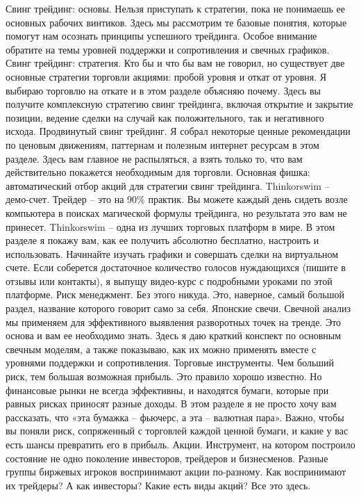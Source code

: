\documentclass[a5paper]{article}
\begin{document}
Свинг трейдинг: основы. Нельзя приступать к стратегии, пока не понимаешь ее основных рабочих винтиков. Здесь мы рассмотрим те базовые понятия, которые помогут нам осознать принципы успешного трейдинга. Особое внимание обратите на темы уровней поддержки и сопротивления и свечных графиков.
Свинг трейдинг: стратегия. Кто бы и что бы вам не говорил, но существует две основные стратегии торговли акциями: пробой уровня и откат от уровня. Я выбираю торговлю на откате и в этом разделе объясняю почему. Здесь вы получите комплексную стратегию свинг трейдинга, включая открытие и закрытие позиции, ведение сделки на случай как положительного, так и негативного исхода.
Продвинутый свинг трейдинг. Я собрал некоторые ценные рекомендации по ценовым движениям, паттернам и полезным интернет ресурсам в этом разделе. Здесь вам главное не распыляться, а взять только то, что вам действительно покажется необходимым для торговли. Основная фишка: автоматический отбор акций для стратегии свинг трейдинга.
Thinkorswim – демо-счет. Трейдер – это на 90\% практик. Вы можете каждый день сидеть возле компьютера в поисках магической формулы трейдинга, но результата это вам не принесет. Thinkorswim – одна из лучших торговых платформ в мире. В этом разделе я покажу вам, как ее получить абсолютно бесплатно, настроить и использовать. Начинайте изучать графики и совершать сделки на виртуальном счете. Если соберется достаточное количество голосов нуждающихся (пишите в отзывы или контакты), я выпущу видео-курс с подробными уроками по этой платформе.
Риск менеджмент. Без этого никуда. Это, наверное, самый большой раздел, название которого говорит само за себя.
Японские свечи. Свечной анализ мы применяем для эффективного выявления разворотных точек на тренде. Это основа и вам ее необходимо знать. Здесь я даю краткий конспект по основным свечным моделям, а также показываю, как их можно применять вместе с уровнями поддержки и сопротивления.
Торговые инструменты. Чем больший риск, тем большая возможная прибыль. Это правило хорошо известно.  Но финансовые рынки не всегда эффективны, и находятся бумаги, которые при равных рисках приносят разные доходы. В этом разделе я не просто хочу вам рассказать, что «эта бумажка – фьючерс, а эта – валютная пара». Важно, чтобы вы поняли риск, сопряженный с торговлей каждой ценной бумаги, и какие у вас есть шансы превратить его в прибыль.
Акции. Инструмент, на котором построило состояние не одно поколение инвесторов, трейдеров и бизнесменов. Разные группы биржевых игроков воспринимают акции по-разному. Как воспринимают их трейдеры? А как инвесторы? Какие есть виды акций? Все это здесь.
\end{document}

